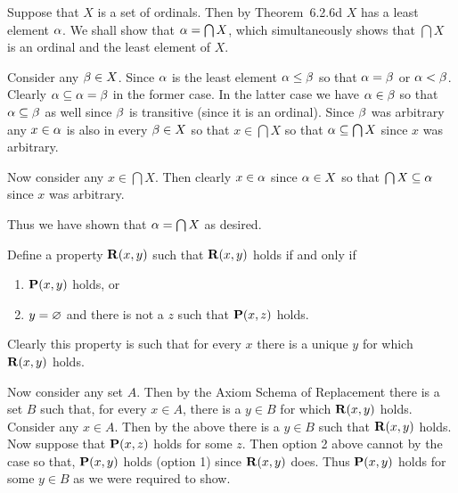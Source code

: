 
\begin{solution}
	Suppose that $X$ is a set of ordinals.
    Then by Theorem~6.2.6d $X$ has a least element $\alpha$.
    We shall show that $\alpha = \bigcap X$, which simultaneously shows that $\bigcap X$ is an ordinal and the least element of $X$.

    Consider any $\beta \in X$.
    Since $\alpha$ is the least element $\alpha \leq \beta$ so that $\alpha = \beta$ or $\alpha < \beta$.
    Clearly $\alpha \subseteq \alpha = \beta$ in the former case.
    In the latter case we have $\alpha \in \beta$ so that $\alpha \subseteq \beta$ as well since $\beta$ is transitive (since it is an ordinal).
    Since $\beta$ was arbitrary any $x \in \alpha$ is also in every $\beta \in X$ so that $x \in \bigcap X$ so that $\alpha \subseteq \bigcap X$ since $x$ was arbitrary.

    Now consider any $x \in \bigcap X$.
    Then clearly $x \in \alpha$ since $\alpha \in X$ so that $\bigcap X \subseteq \alpha$ since $x$ was arbitrary.

    Thus we have shown that $\alpha = \bigcap X$ as desired. \qedsymbol
\end{solution}


\begin{solution}
	Define a property $\mathbf{R}(x,y)$ such that $\mathbf{R}(x,y)$ holds if and only if
    \begin{enumerate}
        \item $\mathbf{P}(x,y)$ holds, or
        \item $y = \varnothing$ and there is not a $z$ such that $\mathbf{P}(x,z)$ holds.
    \end{enumerate}
    Clearly this property is such that for every $x$ there is a unique $y$ for which $\mathbf{R}(x,y)$ holds.

    Now consider any set $A$.
    Then by the Axiom Schema of Replacement there is a set $B$ such that, for every $x \in A$, there is a $y \in B$ for which $\mathbf{R}(x,y)$ holds.
    Consider any $x \in A$.
    Then by the above there is a $y \in B$ such that $\mathbf{R}(x,y)$ holds.
    Now suppose that $\mathbf{P}(x,z)$ holds for some $z$.
    Then option 2 above cannot by the case so that, $\mathbf{P}(x,y)$ holds (option 1) since $\mathbf{R}(x,y)$ does.
    Thus $\mathbf{P}(x,y)$ holds for some $y \in B$ as we were required to show. \qedsymbol
\end{solution}


